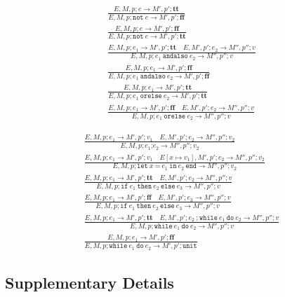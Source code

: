 \documentclass{article}
\newcommand{\btt}{\mathbf{tt}}
\newcommand{\bff}{\mathbf{ff}}
\begin{document}
\begin{align*}
\tag{\sc E-Not1}
\frac{E,M,p;e\rightarrow M',p';\btt}
{E,M,p;\texttt{not}\ e\rightarrow M',p';\bff}
\\
\tag{\sc E-Not2}
\frac{E,M,p;e\rightarrow M',p';\bff}
{E,M,p;\texttt{not}\ e\rightarrow M',p';\btt}
\\
\tag{\sc E-AndAlso1}
\frac{E,M,p;e_1\rightarrow M',p';\btt \quad E,M',p';e_2\rightarrow M'',p'';v}
{E,M,p;e_1\ \texttt{andalso}\ e_2\rightarrow M'',p'';v}
\\
\tag{\sc E-AndAlso2}
\frac{E,M,p;e_1\rightarrow M',p';\bff}
{E,M,p;e_1\ \texttt{andalso}\ e_2\rightarrow M',p';\bff}
\\
\tag{\sc E-OrElse1}
\frac{E,M,p;e_1\rightarrow M',p';\btt}
{E,M,p;e_1\ \texttt{orelse}\ e_2\rightarrow M',p';\btt}
\\
\tag{\sc E-OrElse2}
\frac{E,M,p;e_1\rightarrow M',p';\bff \quad E,M',p';e_2\rightarrow M'',p'';v}
{E,M,p;e_1\ \texttt{orelse}\ e_2\rightarrow M'',p'';v}
\end{align*}

\begin{align*}
\tag{\sc E-Seq}
\frac{E,M,p;e_1\rightarrow M',p';v_1 \quad E,M',p';e_2\rightarrow M'',p'';v_2}
{E,M,p;e_1 \texttt{;} e_2\rightarrow M'',p'';v_2}
\\
\tag{\sc E-Let}
\frac{E,M,p;e_1\rightarrow M',p';v_1 \quad E[x\mapsto v_1],M',p';e_2\rightarrow M'',p'';v_2}
{E,M,p;\texttt{let}\ x\ \texttt{=}\ e_1\ \texttt{in}\ e_2\ \texttt{end}\rightarrow M'',p'';v_2}
\\
\tag{\sc E-Cond1}
\frac{E,M,p;e_1\rightarrow M',p';\btt \quad E,M',p';e_2\rightarrow M'',p'';v}
{E,M,p;\texttt{if}\ e_1\ \texttt{then}\ e_2\ \texttt{else}\ e_3\rightarrow M'',p'';v}
\\
\tag{\sc E-Cond2}
\frac{E,M,p;e_1\rightarrow M',p';\bff \quad E,M',p';e_3\rightarrow M'',p'';v}
{E,M,p;\texttt{if}\ e_1\ \texttt{then}\ e_2\ \texttt{else}\ e_3\rightarrow M'',p'';v}
\\
\tag{\sc E-Loop1}
\frac{E,M,p;e_1\rightarrow M',p';\btt \quad E,M',p';e_2\ \texttt{;}\ \texttt{while}\ e_1\ \texttt{do}\ e_2\rightarrow M'',p'';v}
{E,M,p;\texttt{while}\ e_1\ \texttt{do}\ e_2\rightarrow M'',p'';v}
\\
\tag{\sc E-Loop2}
\frac{E,M,p;e_1\rightarrow M',p';\bff}
{E,M,p;\texttt{while}\ e_1\ \texttt{do}\ e_2\rightarrow M',p';\texttt{unit}}
\end{align*}

\subsection{Supplementary Details}
\end{document}
